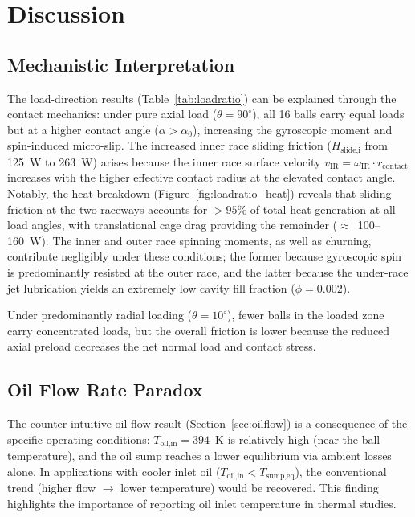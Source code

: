 \documentclass[applsci,article,submit,pdftex,moreauthors]{Definitions/mdpi}
\begin{document}
\section{Discussion}
\label{sec:discussion}

\subsection{Mechanistic Interpretation}

The load-direction results (Table~\ref{tab:loadratio}) can be explained through the contact mechanics: under pure axial load ($\theta = 90^\circ$), all 16 balls carry equal loads but at a higher contact angle ($\alpha > \alpha_0$), increasing the gyroscopic moment and spin-induced micro-slip. The increased inner race sliding friction ($H_{\text{slide,i}}$ from 125~W to 263~W) arises because the inner race surface velocity $v_{\text{IR}} = \omega_{\text{IR}} \cdot r_{\text{contact}}$ increases with the higher effective contact radius at the elevated contact angle. Notably, the heat breakdown (Figure~\ref{fig:loadratio_heat}) reveals that sliding friction at the two raceways accounts for $> 95\%$ of total heat generation at all load angles, with translational cage drag providing the remainder ($\approx$~100--160~W). The inner and outer race spinning moments, as well as churning, contribute negligibly under these conditions; the former because gyroscopic spin is predominantly resisted at the outer race, and the latter because the under-race jet lubrication yields an extremely low cavity fill fraction ($\phi = 0.002$).

Under predominantly radial loading ($\theta = 10^\circ$), fewer balls in the loaded zone carry concentrated loads, but the overall friction is lower because the reduced axial preload decreases the net normal load and contact stress.

\subsection{Oil Flow Rate Paradox}

The counter-intuitive oil flow result (Section~\ref{sec:oilflow}) is a consequence of the specific operating conditions: $T_{\text{oil,in}} = 394$~K is relatively high (near the ball temperature), and the oil sump reaches a lower equilibrium via ambient losses alone. In applications with cooler inlet oil ($T_{\text{oil,in}} < T_{\text{sump,eq}}$), the conventional trend (higher flow $\to$ lower temperature) would be recovered. This finding highlights the importance of reporting oil inlet temperature in thermal studies.
\end{document}
